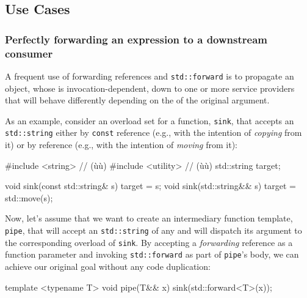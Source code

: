 \subsection[Use Cases]{Use Cases}\label{use-cases-forwardingref}

\subsubsection[Perfectly forwarding an expression to a downstream consumer]{Perfectly forwarding an expression to a downstream consumer}\label{perfectly-forwarding-an-expression-to-a-downstream-consumer}

A frequent use of forwarding references and \lstinline!std::forward! is to
propagate an object, whose  is
invocation-dependent, down to one or more service providers that will
behave differently depending on the  of the
original argument.

As an example, consider an overload set for a function, \lstinline!sink!,
that accepts an \lstinline!std::string! either by \lstinline!const!
 reference (e.g., with the intention of \textit{copying} from it) or by 
 reference (e.g., with the intention of \textit{moving} from it):

\begin{emcppshiddenlisting}[emcppsbatch=e8]
#include <string>   // (ù{}ù)
#include <utility>  // (ù{}ù)
std::string target;
\end{emcppshiddenlisting}
\begin{emcppslisting}[emcppsbatch=e8]
void sink(const std::string& s) { target = s; }
void sink(std::string&& s)      { target = std::move(s); }
\end{emcppslisting}

\noindent Now, let's assume that we want to create an intermediary function
template, \lstinline!pipe!, that will accept an \lstinline!std::string! of any
 and will dispatch its argument to the
corresponding overload of \lstinline!sink!. By accepting a
\emph{forwarding} reference as a function parameter and invoking
\lstinline!std::forward! as part of \lstinline!pipe!'s body, we can achieve
our original goal without any code duplication:

\begin{emcppslisting}[emcppsbatch=e8]
template <typename T>
void pipe(T&& x)
{
    sink(std::forward<T>(x));
}
\end{emcppslisting}

